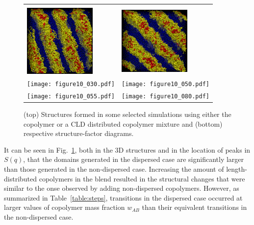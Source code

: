 \documentclass[
aip,
jcp,
reprint,
]{revtex4-1}
\begin{document}
\begin{figure}
\begin{tabular}{C{1.6in}@{}C{1.6in}}
		  \\ \includegraphics[width=1.4in]{A5B5_080} & \includegraphics[width=1.4in]{A5B5_Flory_080} \\
		\texttt{[image: figure10\_030.pdf]} & \texttt{[image: figure10\_050.pdf]} \\
		\texttt{[image: figure10\_055.pdf]} & \texttt{[image: figure10\_080.pdf]}
	\end{tabular}
	\caption{(top) Structures formed in some selected simulations using either the  copolymer or a CLD distributed copolymer mixture and (bottom) respective structure-factor diagrams.}
	\label{fig:Figure_10}
\end{figure}

It can be seen in Fig.~\ref{fig:Figure_10}, both in the 3D structures and in the location of peaks in $S(q)$, that the domains generated in the dispersed case are significantly larger than those generated in the non-dispersed case.
Increasing the amount of length-distributed copolymers in the blend resulted in the structural changes that were similar to the onse observed by adding non-dispersed copolymers.
However, as summarized in Table~\ref{table:steps}, transitions in the dispersed case occurred at larger values of copolymer mass fraction $w_{AB}$ than their equivalent transitions in the non-dispersed case.
\end{document}
